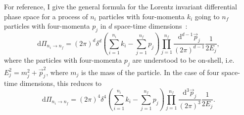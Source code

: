 \documentclass[../main.tex]{subfiles}
\begin{document}
For reference, I give the general formula for the Lorentz invariant differential phase space for a process of \(n_i\) particles with four-momenta \(k_i\) going to \(n_f\) particles with four-momenta \(p_j\) in \(d\) space-time dimensions~\cite{Schwartz:2014sze}:
\begin{equation}
  \label{part:eq:dPi_d}
  \mathrm{d}\Pi_{n_i \to n_f} =  (2\pi)^d \delta^d(\sum_{i=1}^{n_i} k_i - \sum_{j=1}^{n_f} p_j) \prod_{j=1}^{n_f} \frac{\mathrm{d}^{d-1}\vec{p}_j}{(2\pi)^{d-1}} \frac{1}{2E_j},
\end{equation}
where the particles with four-momenta \(p_j\) are understood to be  on-shell, i.e. \(E_j^2 = m_j^2 + \vec{p}_j^2\), where \(m_j\) is the mass of the particle.
In the case of four space-time dimensions, this reduces to
\begin{equation}
  \label{part:eq:dPi_4}
  \mathrm{d}\Pi_{n_i \to n_f} =  (2\pi)^4 \delta^4(\sum_{i=1}^{n_i} k_i - \sum_{j=1}^{n_f} p_j) \prod_{j=1}^{n_f} \frac{\mathrm{d}^{3}\vec{p}_j}{(2\pi)^{3}} \frac{1}{2E_j}.
\end{equation}
\end{document}
